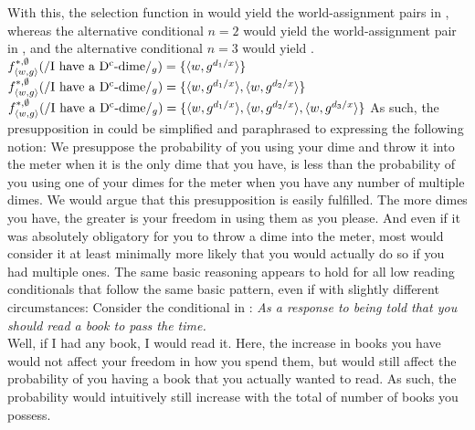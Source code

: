 \noindent With this, the selection function in  would yield the world-assignment pairs in , whereas the alternative conditional $n=2$ would yield the world-assignment pair in , and the alternative conditional $n=3$ would yield .
\pex[nopreamble=true]%
\a{} $f^{*,\emptyset}_{\langle w,g\rangle}(/\text{I have a D\textsuperscript{c}-dime}/_g)=\{\langle w,g^{d_1/x}\rangle\}$
\a{} $f^{*,\emptyset}_{\langle w,g\rangle}(/\text{I have a D\textsuperscript{c}-dime}/_g)=\{\langle w,g^{d_1/x}\rangle,\langle w,g^{d_2/x}\rangle\}$
\a{} $f^{*,\emptyset}_{\langle w,g\rangle}(/\text{I have a D\textsuperscript{c}-dime}/_g)=\{\langle w,g^{d_1/x}\rangle,\langle w,g^{d_2/x}\rangle,\langle w,g^{d_3/x}\rangle\}$
\xe
As such, the presupposition in  could be simplified and paraphrased to expressing the following notion: We presuppose the probability of you using your dime and throw it into the meter when it is the only dime that you have, is less than the probability of you using one of your dimes for the meter when you have any number of multiple dimes. We would argue that this presupposition is easily fulfilled. The more dimes you have, the greater is your freedom in using them as you please. And even if it was absolutely obligatory for you to throw a dime into the meter, most would consider it at least minimally more likely that you would actually do so if you had multiple ones. The same basic reasoning appears to hold for all low reading conditionals that follow the same basic pattern, even if with slightly different circumstances: Consider the conditional in :
\ex{}\textit{As a response to being told that you should read a book to pass the time.}\\
Well, if I had any book, I would read it.
\xe
Here, the increase in books you have would not affect your freedom in how you spend them, but would still affect the probability of you having a book that you actually wanted to read. As such, the probability would intuitively still increase with the total of number of books you possess.

